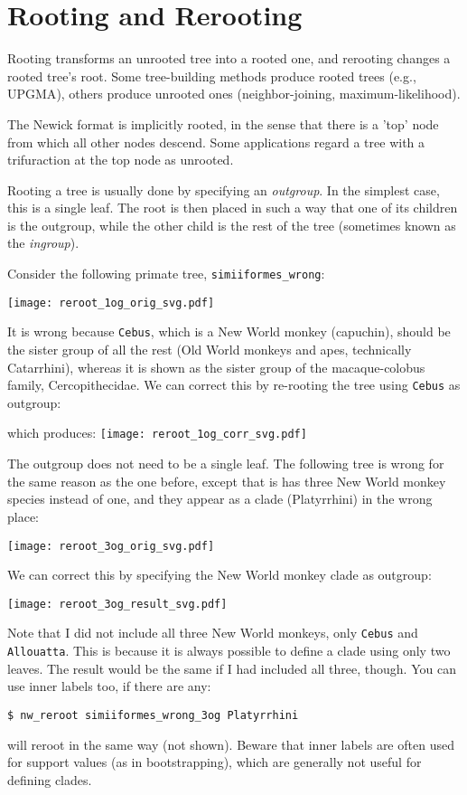 
\section{Rooting and Rerooting}
\label{sct_reroot}

Rooting transforms an unrooted tree into a rooted one, and rerooting changes a rooted tree's root. Some tree-building methods produce rooted trees (e.g., \textsc{UPGMA}), others produce unrooted ones (neighbor-joining, maximum-likelihood). 

The Newick format is implicitly rooted, in the sense that there is a 'top' node from which all other nodes descend. Some applications regard a tree with a trifuraction at the top node as unrooted. 

Rooting a tree is usually done by specifying an \textit{outgroup}. In the simplest case, this is a single leaf. The root is then placed in such a way that one of its children is the outgroup, while the other child is the rest of the tree (sometimes known as the \textit{ingroup}). 

Consider the following primate tree, \texttt{simiiformes\_wrong}:

\texttt{[image: reroot\_1og\_orig\_svg.pdf]}

\noindent{}It is wrong because \texttt{Cebus}, which is a New World monkey (capuchin), should be the sister group of all the rest (Old World monkeys and apes, technically Catarrhini), whereas it is shown as the sister group of the macaque-colobus family, Cercopithecidae. We can correct this by re-rooting the tree using \texttt{Cebus} as outgroup:

which produces:
\texttt{[image: reroot\_1og\_corr\_svg.pdf]}

The outgroup does not need to be a single leaf. The following tree is wrong for the same reason as the one before, except that is has three New World monkey species instead of one, and they appear as a clade (Platyrrhini) in the wrong place:

\texttt{[image: reroot\_3og\_orig\_svg.pdf]}

\noindent{}We can correct this by specifying the New World monkey clade as outgroup:



\texttt{[image: reroot\_3og\_result\_svg.pdf]}

\noindent{}Note that I did not include all three New World monkeys, only \texttt{Cebus} and \texttt{Allouatta}. This is because it is always possible to define a clade using only two leaves. The result would be the same if I had included all three, though. You can use inner labels too, if there are any:
\begin{verbatim}
$ nw_reroot simiiformes_wrong_3og Platyrrhini
\end{verbatim}
will reroot in the same way (not shown). Beware that inner labels are often used for support values (as in bootstrapping), which are generally not useful for defining clades.
